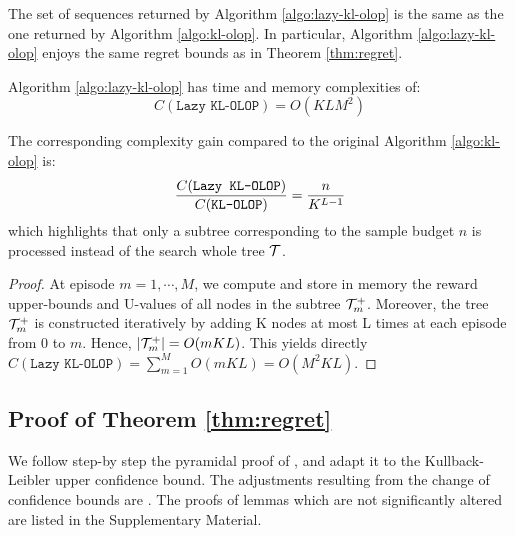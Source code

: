 \begin{theorem}[Consistency]
	\label{thm:consistency}
	\begin{leftbar}[theorembar]
	The set of sequences returned by Algorithm \ref{algo:lazy-kl-olop} is the same as the one returned by Algorithm \ref{algo:kl-olop}.
	In particular, Algorithm \ref{algo:lazy-kl-olop} enjoys the same regret bounds as in Theorem \ref{thm:regret}.
	\end{leftbar}
\end{theorem}

\begin{proposition}
	\begin{leftbar}[propositionbar]
	Algorithm \ref{algo:lazy-kl-olop} has time and memory complexities of:
	\begin{equation*}
	C(\texttt{Lazy KL-OLOP}) = O(KLM^2)
	\end{equation*}
	
	The corresponding complexity gain compared to the original Algorithm \ref{algo:kl-olop} is: 
	\begin{equation*}
	\frac{C(\texttt{Lazy KL-OLOP})}{C(\texttt{KL-OLOP})} = \frac{n}{K^{L-1}}
	\end{equation*}
	which highlights that only a subtree corresponding to the sample budget $n$ is processed instead of the search whole tree $\mathcal{T}$.
	\end{leftbar}
\end{proposition}
\begin{proof}
	At episode $m = 1, \cdots, M$, we compute and store in memory the reward upper-bounds and U-values of all nodes in the subtree $\mathcal{T}_m^+$. Moreover, the tree $\mathcal{T}_m^+$ is constructed iteratively by adding K nodes at most L times at each episode from 0 to $m$. Hence, $|\mathcal{T}_m^+| = O(mKL)$.
	This yields directly $C(\texttt{Lazy KL-OLOP}) = \sum_{m=1}^M O(mKL) = O(M^2KL)$.
\end{proof}

\subsection{Proof of Theorem \ref{thm:regret}}
\label{sec:regret-proof}


We follow step-by step the pyramidal proof of \citep{Bubeck2010}, and adapt it to the Kullback-Leibler upper confidence bound. The adjustments resulting from the change of confidence bounds are . The proofs of lemmas which are not significantly altered are listed in the Supplementary Material. 

